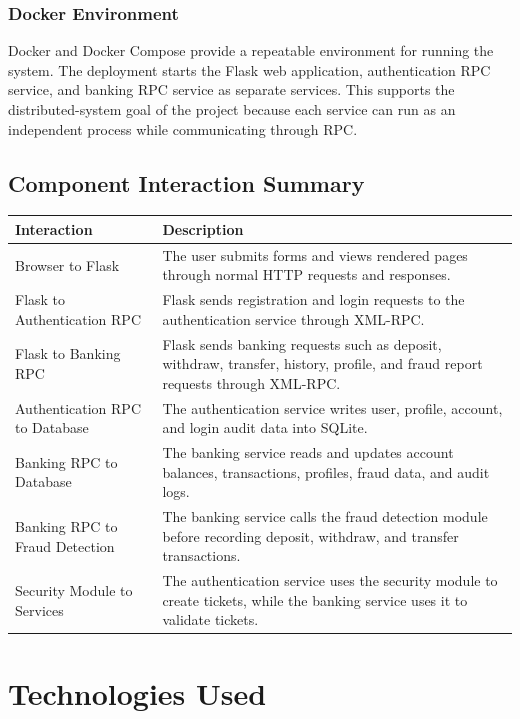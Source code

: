 \documentclass[12pt,a4paper]{article}
\newcommand{\sectionbreakguard}{\Needspace{8\baselineskip}}
\newcommand{\subsectionbreakguard}{\Needspace{5\baselineskip}}
\begin{document}
\subsubsection{Docker Environment}

Docker and Docker Compose provide a repeatable environment for running the system. The deployment starts the Flask web application, authentication RPC service, and banking RPC service as separate services. This supports the distributed-system goal of the project because each service can run as an independent process while communicating through RPC.

\subsectionbreakguard
\subsection{Component Interaction Summary}

\begin{longtable}{|p{4cm}|p{10cm}|}
\hline
\textbf{Interaction} & \textbf{Description} \\
\hline
Browser to Flask & The user submits forms and views rendered pages through normal HTTP requests and responses. \\
\hline
Flask to Authentication RPC & Flask sends registration and login requests to the authentication service through XML-RPC. \\
\hline
Flask to Banking RPC & Flask sends banking requests such as deposit, withdraw, transfer, history, profile, and fraud report requests through XML-RPC. \\
\hline
Authentication RPC to Database & The authentication service writes user, profile, account, and login audit data into SQLite. \\
\hline
Banking RPC to Database & The banking service reads and updates account balances, transactions, profiles, fraud data, and audit logs. \\
\hline
Banking RPC to Fraud Detection & The banking service calls the fraud detection module before recording deposit, withdraw, and transfer transactions. \\
\hline
Security Module to Services & The authentication service uses the security module to create tickets, while the banking service uses it to validate tickets. \\
\hline
\end{longtable}

\sectionbreakguard
\section{Technologies Used}
\end{document}
